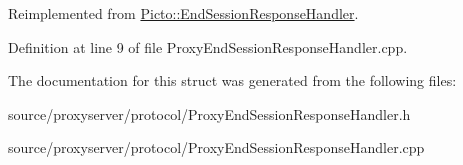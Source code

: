 Reimplemented from \hyperlink{struct_picto_1_1_end_session_response_handler_aa8a23275f73e69c89dd2857c64eeaeff}{Picto\-::\-End\-Session\-Response\-Handler}.



Definition at line 9 of file Proxy\-End\-Session\-Response\-Handler.\-cpp.



The documentation for this struct was generated from the following files\-:\begin{DoxyCompactItemize}
\item 
source/proxyserver/protocol/Proxy\-End\-Session\-Response\-Handler.\-h\item 
source/proxyserver/protocol/Proxy\-End\-Session\-Response\-Handler.\-cpp\end{DoxyCompactItemize}
